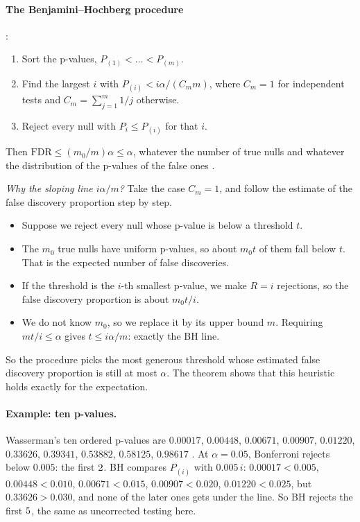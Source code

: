 \paragraph{The Benjamini--Hochberg procedure} :
\begin{enumerate}[label=\arabic*.]
  \item Sort the p-values, $P_{(1)}<\dots<P_{(m)}$.
  \item Find the largest $i$ with $P_{(i)}<i\alpha/(C_mm)$, where $C_m=1$ for
        independent tests and $C_m=\sum_{j=1}^m1/j$ otherwise.
  \item Reject every null with $P_i\le P_{(i)}$ for that $i$.
\end{enumerate}
Then $\mathrm{FDR}\le(m_0/m)\alpha\le\alpha$, whatever the number of true nulls
and whatever the distribution of the p-values of the false ones
.

\emph{Why the sloping line $i\alpha/m$?} Take the case $C_m=1$, and follow the
estimate of the false discovery proportion step by step.
\begin{itemize}[itemsep=1pt,leftmargin=1.2em]
  \item Suppose we reject every null whose p-value is below a threshold $t$.
  \item The $m_0$ true nulls have uniform p-values, so about $m_0t$ of them fall
        below $t$. That is the expected number of false discoveries.
  \item If the threshold is the $i$-th smallest p-value, we make $R=i$
        rejections, so the false discovery proportion is about $m_0t/i$.
  \item We do not know $m_0$, so we replace it by its upper bound $m$. Requiring
        $mt/i\le\alpha$ gives $t\le i\alpha/m$: exactly the BH line.
\end{itemize}
So the procedure picks the most generous threshold whose estimated false
discovery proportion is still at most $\alpha$. The theorem shows that this
heuristic holds exactly for the expectation.

\paragraph{Example: ten p-values.}
Wasserman's ten ordered p-values are $0.00017$, $0.00448$, $0.00671$, $0.00907$,
$0.01220$, $0.33626$, $0.39341$, $0.53882$, $0.58125$, $0.98617$
. At $\alpha=0.05$, Bonferroni rejects below $0.005$: the
first $2$. BH compares $P_{(i)}$ with $0.005\,i$: $0.00017<0.005$,
$0.00448<0.010$, $0.00671<0.015$, $0.00907<0.020$, $0.01220<0.025$, but
$0.33626>0.030$, and none of the later ones gets under the line. So
BH rejects the first $5$, the same as uncorrected testing here.


